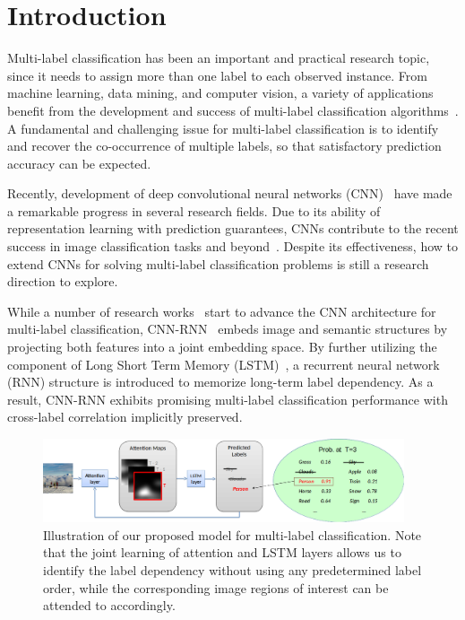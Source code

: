 \documentclass[letterpaper]{article} %
\begin{document}
\section{Introduction}
\label{sec:intro}

Multi-label classification has been an important and practical research topic, since it needs to assign more than one label to each observed instance. From machine learning, data mining, and computer vision, a variety of applications benefit from the development and success of multi-label classification algorithms~\cite{zhang2014review,boutell2004learning,schapire2000boostexter,godbole2004discriminative,lin2014microsoft,kang2016object,kang2016t,boutell2004learning,shao2016slicing}. A fundamental and challenging issue for multi-label classification is to identify and recover the co-occurrence of multiple labels, so that satisfactory prediction accuracy can be expected.


Recently, development of deep convolutional neural networks (CNN)~\cite{krizhevsky2012imagenet,szegedy2015going,simonyan2014very,he2016deep} have made a remarkable progress in several research fields. Due to its ability of representation learning with prediction guarantees, CNNs contribute to the recent success in image classification tasks and beyond~\cite{deng2009imagenet,fei2007learning,griffin2007caltech}.
Despite its effectiveness, how to extend CNNs for solving multi-label classification problems is still a research direction to explore.

While a number of research works~\cite{zhang2006multilabel,nam2014large,gong2013deep,wei2014cnn,wang2016cnn} start to advance the CNN architecture for multi-label classification, CNN-RNN~\cite{wang2016cnn} embeds image and semantic structures by projecting both features into a joint embedding space. By further utilizing the component of Long Short Term Memory (LSTM)~\cite{hochreiter1997long}, a recurrent neural network (RNN) structure is introduced to memorize long-term label dependency. As a result, CNN-RNN exhibits promising multi-label classification performance with cross-label correlation implicitly preserved.


\begin{figure}[t!]
	\centering
	\includegraphics[width=0.95\textwidth]{./intro_fig.png}
	\caption{Illustration of our proposed model for multi-label classification. Note that the joint learning of attention and LSTM layers allows us to identify the label dependency without using any predetermined label order, while the corresponding image regions of interest can be attended to accordingly.}
	\label{fig:1}
\end{figure}
\end{document}
